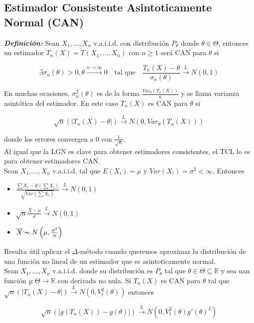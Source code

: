 \subsection{Estimador Consistente Asintoticamente Normal (CAN)}

\textbf{\textit{Definición: }} Sean $X_1,\dots,X_n$ v.a.i.i.d. con distribución $P_\theta$ donde $\theta \in \Theta$, entonces un estimador $T_n(X)=T(X_1,\dots,X_n)$ con $n\geq 1$ será CAN para $\theta$ si

\[
    \exists \sigma_n(\theta) > 0, \theta \xrightarrow{n\to\infty}0 \quad \text{tal que}\quad \frac{T_n(X)-\theta}{\sigma_n(\theta)}\overset{L}{\to}N(0,1)
\]

En muchas ocasiones, $\sigma^2_n(\theta)$ es de la forma $\frac{Var_\theta(T_n(X))}{n}$ y se llama varianza asintótica del estimador. En este caso $T_n(X)$ es CAN para $\theta$ si

\[
    \sqrt{n}(|T_n(X)-\theta|) \overset{L}{\to} N(0, Var_\theta(T_n(X)))
\]

donde los errores convergen a 0 con $\frac{1}{\sqrt{n}}$. \\

Al igual que la LGN es clave para obtener estimadores consistentes, el TCL lo es para obtener estimadores CAN. \\
Sean $X_1,\dots,X_n$ v.a.i.i.d. tal que $E(X_i)=\mu$ y $Var(X_i)=\sigma^2 < \infty$. Entonces

\begin{itemize}
    \item $\frac{\sum{X_i} - E(\sum{X_i})}{\sqrt{Var(\sum{X_i})}} \overset{L}{\to} N(0,1)$
    \item $\sqrt{n}\frac{\overline{X}-\mu}{\sigma}\overset{L}{\to}N(0,1)$
    \item $\overline{X}\thicksim N\left(\mu,\frac{\sigma^2}{n}\right)$
\end{itemize}

Resulta útil aplicar el $\Delta$-método cuando queremos aproximar la distribución de una función no lineal de un estimador que es asintoticamente normal.\\
Sean $X_1,\dots,X_n$ v.a.i.i.d. donde su distribución es $P_\theta$ tal que $\theta \in \Theta \subseteq \mathbb{R}$ y sea uan función $g:\Theta \to \mathbb{R}$ con derivada no nula. Si $T_n(X)$ es CAN para $\theta$ tal que $\sqrt{n}(|T_n(X)-\theta|)\overset{L}{\to}N(0,V^2_t(\theta))$ entonces

\[
    \sqrt{n}(|g(T_n(X))-g(\theta)|)\overset{L}{\to}N(0,V^2_t(\theta)g'(\theta)^2)
\]
